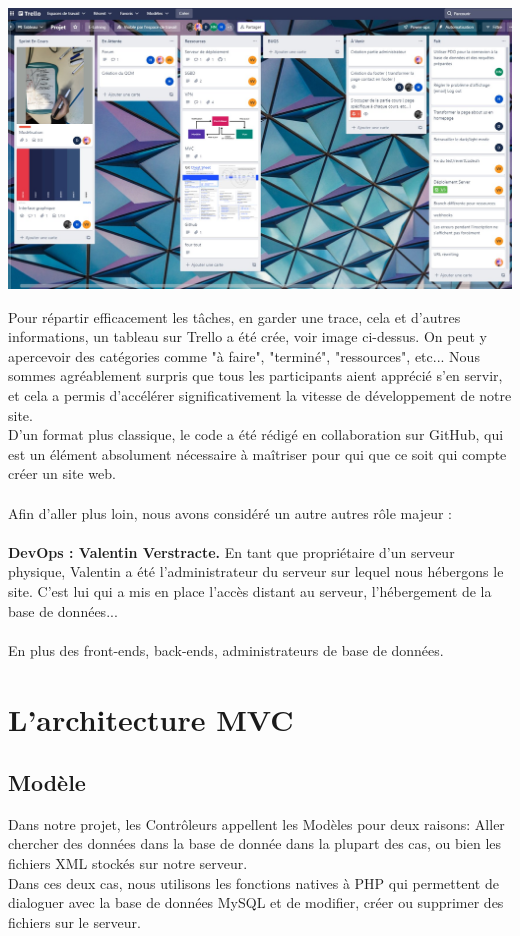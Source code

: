 \documentclass[a4paper,11pt]{article}
\begin{document}
\centerline{
    \includegraphics[width=14cm]{images/trello.png}
}

Pour répartir efficacement les tâches, en garder une trace, cela et d'autres informations, un tableau sur Trello a été crée, voir image ci-dessus. On peut y apercevoir des catégories comme "à faire", "terminé", "ressources", etc... Nous sommes agréablement surpris que tous les participants aient apprécié s'en servir, et cela a permis d'accélérer significativement la vitesse de développement de notre site.\\
D'un format plus classique, le code a été rédigé en collaboration sur GitHub, qui est un élément absolument nécessaire à maîtriser pour qui que ce soit qui compte créer un site web.\\\\

Afin d'aller plus loin, nous avons considéré un autre autres rôle majeur :\\\\
\textbf{DevOps : Valentin Verstracte.} En tant que propriétaire d'un serveur physique, Valentin a été l'administrateur du serveur sur lequel nous hébergons le site. C'est lui qui a mis en place l'accès distant au serveur, l'hébergement de la base de données... \\\\
En plus des front-ends, back-ends, administrateurs de base de données.




\section{L'architecture MVC}
\subsection{Modèle}
Dans notre projet, les Contrôleurs appellent les Modèles pour deux raisons: Aller chercher des données dans la base de donnée dans la plupart des cas, ou bien les fichiers XML stockés sur notre serveur.\\
Dans ces deux cas, nous utilisons les fonctions natives à PHP qui permettent de dialoguer avec la base de données MySQL et de modifier, créer ou supprimer des fichiers sur le serveur.
\end{document}
